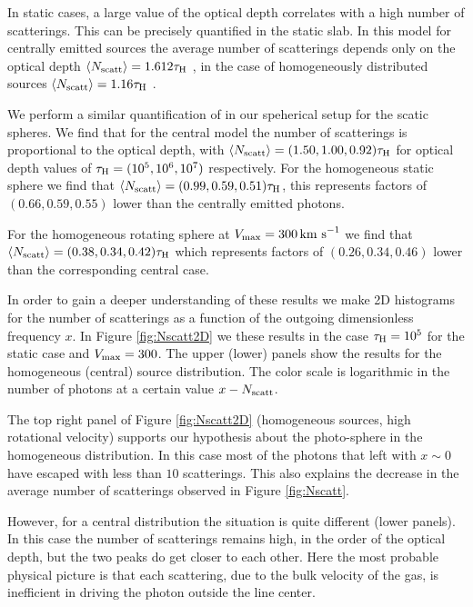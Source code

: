 \documentclass{emulateapj}
\newcommand{\kms}{{\ifmmode{{\mathrm{\,km\ s}^{-1}}}\else{\,km~s$^{-1}$}\fi}}
\begin{document}
In static cases, a large value of the optical depth correlates with a
high number of scatterings.  This can be precisely quantified in the
static slab. In this model for centrally emitted sources the average
number of scatterings depends only on the optical depth $\langle
N_{\rm  scatt}\rangle=1.612\tau_{\rm   H}$
\citep{Adams72,Harrington73}, in the case of homogeneously distributed
sources $\langle N_{\rm   scatt}\rangle=1.16\tau_{\rm   H}$
\citep{Harrington73}.     

We perform a similar quantification of in our speherical setup for the
scatic spheres. We find that for the central model the number of
scatterings is proportional to the optical depth, with $\langle N_{\rm
  scatt}\rangle= (1.50, 1.00, 0.92)\tau_{\rm   H}$ for optical depth
values of $\tau_{\rm H} = (10^{5}, 10^{6}, 10^{7})$ respectively.
For the homogeneous static sphere we find that $\langle N_{\rm
  scatt}\rangle= (0.99, 0.59, 0.51)\tau_{\rm   H}$, this represents
factors of $(0.66, 0.59, 0.55)$ lower than the centrally  emitted photons. 

For the homogeneous rotating sphere at  $V_{\rm{max}}=300\kms$ we find
that $\langle N_{\rm   scatt}\rangle=(0.38, 0.34, 0.42)\tau_{\rm   H}$
which represents   factors of $(0.26, 0.34, 0.46)$ lower than the
corresponding central case.  

In order to gain a deeper understanding of these results  we make 2D
histograms for the number of scatterings as a function of the outgoing
dimensionless frequency $x$. In Figure \ref{fig:Nscatt2D} we these 
results in the case $\tau_{\rm H}=10^5$ for the
static case and $V_{\rm max}=300$\kms. The upper (lower) panels show the
results for the homogeneous (central) source distribution. The color
scale is logarithmic in the number of photons at a certain value
$x-N_{\rm scatt}$. 

The top right panel of Figure \ref{fig:Nscatt2D} (homogeneous sources,
high rotational velocity) supports our hypothesis about
the photo-sphere in the homogeneous distribution. In this case most of
the photons that left with $x\sim 0$ have escaped with less than $10$
scatterings. This also explains the decrease in the average number of
scatterings observed in Figure \ref{fig:Nscatt}.

However, for a central distribution the situation is quite different
(lower panels). In this case the number of scatterings remains high,
in the order of the optical depth, but the two peaks do get closer to each
other. Here the most probable physical picture is that each
scattering, due to the bulk velocity of the gas, is inefficient in
driving the photon outside the line center.
\end{document}
